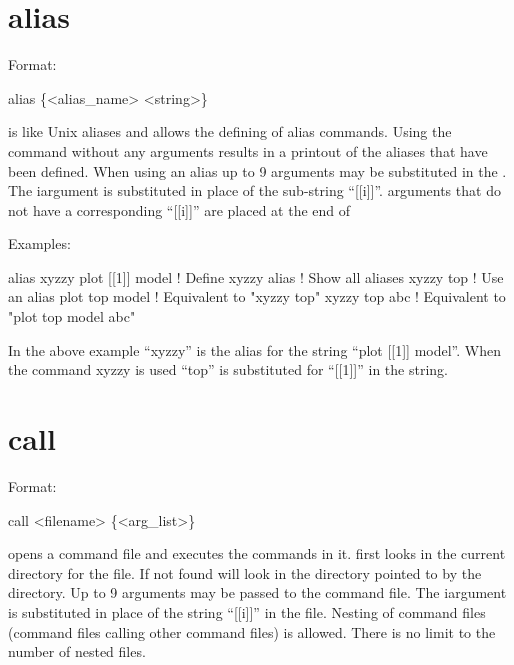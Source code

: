 \section{alias}
\label{s:alias}

Format: 
\begin{example}
  alias \{<alias_name> <string>\}
\end{example}

\vskip 0.2in

 is like Unix aliases and allows the defining of alias
commands. Using the  command without any arguments results
in a printout of the aliases that have been defined. When using an
alias up to 9 arguments may be substituted in the . The
i\Th argument is substituted in place of the sub-string ``[[i]]''.
arguments that do not have a corresponding ``[[i]]'' are placed at the end
of 

Examples:
\begin{example}
    alias xyzzy plot [[1]] model  ! Define xyzzy
    alias                         ! Show all aliases
    xyzzy top                     ! Use an alias
    plot top model                ! Equivalent to "xyzzy top"
    xyzzy top abc                 ! Equivalent to "plot top model abc"
\end{example}
In the above example ``xyzzy'' is the alias for the string ``plot [[1]]
model''.  When the command xyzzy is used ``top'' is substituted
for ``[[1]]'' in the string.

\section{call}
\label{s:call}

Format: 
\begin{example}
  call <filename> \{<arg_list>\}  \Strut
\end{example}

\vskip 0.2in 
 opens a command file and executes the commands
in it.  \tao first looks in the current directory for the file. If not
found \tao will look in the directory pointed to by the
 directory.  Up to 9 arguments may be passed to
the command file. The i\Th argument is substituted in place of the
string ``[[i]]'' in the file. Nesting of command files (command files
calling other command files) is allowed. There is no limit to the
number of nested files.

